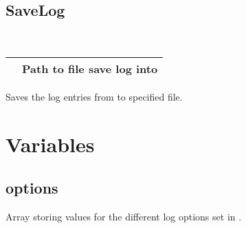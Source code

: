 \documentclass[letterpaper,10pt,english]{sphinxmanual}
\begin{document}
\subsection{SaveLog}
\label{\detokenize{log:savelog}}

\begin{fulllineitems}
\label{\detokenize{log:_CPPv2N6pessum7SaveLogENSt6stringE}}%
\pysigstartmultiline
{}%
\pysigstopmultiline~

\begin{savenotes}\sphinxattablestart
\centering
\begin{tabulary}{\linewidth}[t]{|T|T|}
\hline

&
Path to file save log into
\\
\hline
\end{tabulary}
\par
\sphinxattableend\end{savenotes}

Saves the log entries from {\hyperref[\detokenize{log:_CPPv2N6pessum11global_logsE}]{}} to specified file.

\end{fulllineitems}



\section{Variables}
\label{\detokenize{log:variables}}

\subsection{options}
\label{\detokenize{log:options}}

\begin{fulllineitems}
\label{\detokenize{log:_CPPv2N6pessum7optionsE}}%
\pysigstartmultiline
{}%
\pysigstopmultiline
Array storing values for the different log options set in {\hyperref[\detokenize{log:_CPPv2N6pessum12SetLogOptionEii}]{}}.

\end{fulllineitems}
\end{document}
